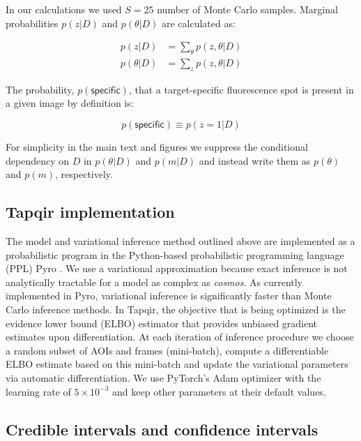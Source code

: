 In our calculations we used $S = 25$ number of Monte Carlo samples. Marginal probabilities $p(z | D)$ and $p(\theta | D)$ are calculated as:

\begin{subequations}
\begin{align}
    p(z | D) &= \sum_{\theta} p(z, \theta | D) \\
    p(\theta | D) &= \sum_{z} p(z, \theta | D)
\end{align}
\end{subequations}

The probability, $p(\mathsf{specific})$, that a target-specific fluorescence spot is present in a given image by definition is:

\begin{equation}
    p(\mathsf{specific}) \equiv p(z = 1 | D)
\end{equation}

For simplicity in the main text and figures we suppress the conditional dependency on $D$ in $p(\theta | D)$ and $p(m | D)$ and instead write them as $p(\theta)$ and $p(m)$, respectively.

\subsection{Tapqir implementation}

The model and variational inference method outlined above are implemented as a probabilistic program in the Python-based probabilistic programming language (PPL) Pyro \citep{Foerster2018-kd,Bingham2019-qy,Obermeyer2019-xt}. We use a variational approximation because exact inference is not analytically tractable for a model as complex as \emph{cosmos}. As currently implemented in Pyro, variational inference is significantly faster than Monte Carlo inference methods. In Tapqir, the objective that is being optimized is the evidence lower bound (ELBO) estimator that provides unbiased gradient estimates upon differentiation. At each iteration of inference procedure we choose a random subset of AOIs and frames (mini-batch), compute a differentiable ELBO estimate based on this mini-batch and update the variational parameters via automatic differentiation. We use PyTorch's Adam optimizer \citep{Kingma2014-cz} with the learning rate of $5\times 10^{-3}$ and keep other parameters at their default values. 


\subsection{Credible intervals and confidence intervals}

